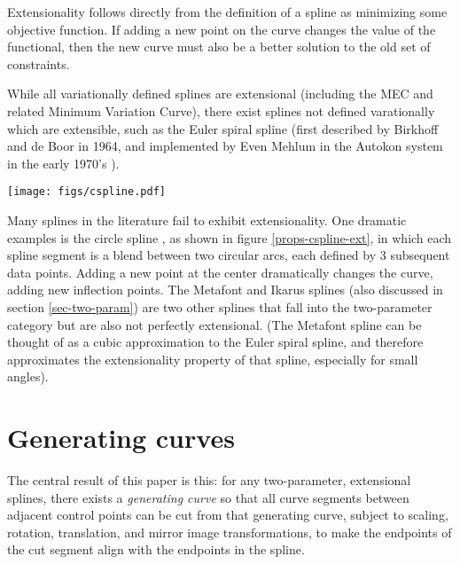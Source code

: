 \documentclass{article}
\begin{document}
Extensionality follows directly from the definition of a spline as
minimizing some objective function. If adding a new point on the curve
changes the value of the functional, then the new curve must also be a
better solution to the old set of constraints.

While all variationally defined splines are extensional (including the
MEC and related Minimum Variation Curve), there exist splines not
defined varationally which are extensible, such as the Euler spiral
spline (first described by Birkhoff and de Boor \cite{Birkhoff65} in
1964, and implemented by Even Mehlum in the Autokon system in the
early 1970's \cite{Mehlum74}).

\begin{figure*}[tbh]
\begin{center}
\texttt{[image: figs/cspline.pdf]}
\caption{\label{props-cspline-ext}Circle spline extensionality failure.}
\end{center}
\end{figure*}

Many splines in the literature fail to exhibit extensionality. One
dramatic examples is the circle spline
\cite{DBLP:journals/cad/SequinLY05}, as shown in figure
\ref{props-cspline-ext}, in which each spline segment is a blend
between two circular arcs, each defined by 3 subsequent data
points. Adding a new point at the center dramatically changes the
curve, adding new inflection points. The Metafont \cite{Hobby85} and
Ikarus \cite{Karow87} splines (also discussed in section
\ref{sec-two-param}) are two other splines that fall into the
two-parameter category but are also not perfectly extensional. (The
Metafont spline can be thought of as a cubic approximation to the
Euler spiral spline, and therefore approximates the extensionality
property of that spline, especially for small angles).

\section{Generating curves}

The central result of this paper is this: for any two-parameter,
extensional splines, there exists a \emph{generating curve} so that
all curve segments between adjacent control points can be cut from
that generating curve, subject to scaling, rotation, translation, and
mirror image transformations, to make the endpoints of the cut segment
align with the endpoints in the spline.
\end{document}
